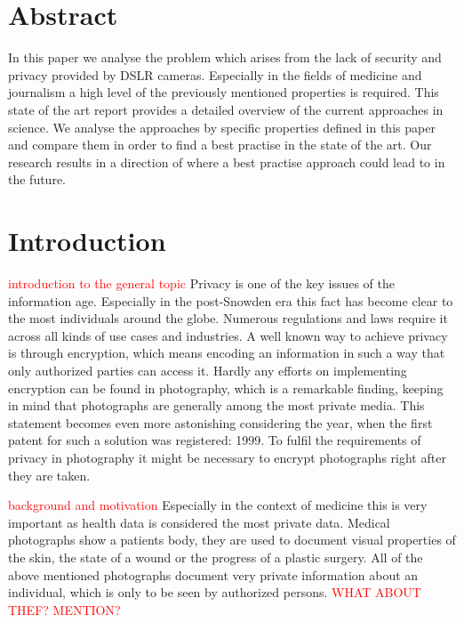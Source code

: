 \documentclass[12pt,a4paper,titlepage,oneside]{scrartcl}
\newcommand\todo[1]{\textcolor{red}{#1}}
\begin{document}
\maketitle
\setcounter{section}{0}
\setcounter{tocdepth}{2}
\tableofcontents
\newpage

\section*{Abstract}
In this paper we analyse the problem which arises from the lack of security and privacy provided by DSLR cameras.
Especially in the fields of medicine and journalism a high level of the previously mentioned properties is required.
This state of the art report provides a detailed overview of the current approaches in science.
We analyse the approaches by specific properties defined in this paper and compare them in order to find a best practise in the state of the art.
Our research results in a direction of where a best practise approach could lead to in the future.

\newpage
\section{Introduction}

\todo{introduction to the general topic}
Privacy is one of the key issues of the information age.
Especially in the post-Snowden era this fact has become clear to the most individuals around the globe. 
Numerous regulations and laws \cite{EHG2015, DSG2000, ELGA2012, EuropeanParliament2016, EuropeanCourtofHumanRights2010} require it across all kinds of use cases and industries.
A well known way to achieve privacy is through encryption, which means encoding an information in such a way that only authorized parties can access it. 
Hardly any efforts on implementing encryption can be found in photography, which is a remarkable finding, keeping in mind that photographs are generally among the most private media.
This statement becomes even more astonishing considering the year, when the first patent for such a solution was registered: 1999. \cite{steinberg1999method}
To fulfil the requirements of privacy in photography it might be necessary to encrypt photographs right after they are taken.

\todo{background and motivation}
Especially in the context of medicine this is very important as health data is considered the most private data. \cite{williams2013}
Medical photographs show a patients body, they are used to document visual properties of the skin, the state of a wound or the progress of a plastic surgery. 
All of the above mentioned photographs document very private information about an individual, which is only to be seen by authorized persons. \todo{WHAT ABOUT THEF? MENTION?}
\end{document}
